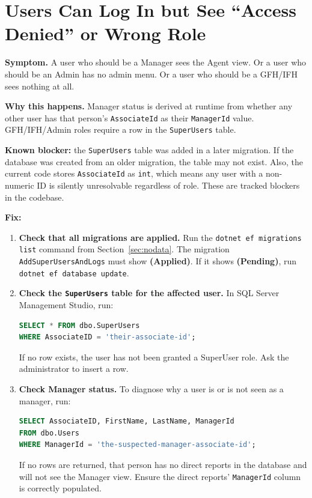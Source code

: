 \documentclass[a4paper,11pt]{article}
\begin{document}
\section{Users Can Log In but See ``Access Denied'' or Wrong Role}
\label{sec:wrongrole}

\textbf{Symptom.}
A user who should be a Manager sees the Agent view.
Or a user who should be an Admin has no admin menu.
Or a user who should be a GFH/IFH sees nothing at all.

\textbf{Why this happens.}
Manager status is derived at runtime from whether any other user has that person's
\texttt{AssociateId} as their \texttt{ManagerId} value.
GFH/IFH/Admin roles require a row in the \texttt{SuperUsers} table.

\begin{warnbox}
\textbf{Known blocker:} the \texttt{SuperUsers} table was added in a later migration.
If the database was created from an older migration, the table may not exist.
Also, the current code stores \texttt{AssociateId} as \texttt{int},
which means any user with a non-numeric ID is silently unresolvable regardless of role.
These are tracked blockers in the codebase.
\end{warnbox}

\textbf{Fix:}

\begin{enumerate}
  \item \textbf{Check that all migrations are applied.}
        Run the \texttt{dotnet ef migrations list} command from Section~\ref{sec:nodata}.
        The migration \texttt{AddSuperUsersAndLogs} must show \textbf{(Applied)}.
        If it shows \textbf{(Pending)}, run \texttt{dotnet ef database update}.
  \item \textbf{Check the \texttt{SuperUsers} table for the affected user.}
        In SQL Server Management Studio, run:
\begin{lstlisting}[language=SQL]
SELECT * FROM dbo.SuperUsers
WHERE AssociateID = 'their-associate-id';
\end{lstlisting}
        If no row exists, the user has not been granted a SuperUser role.
        Ask the administrator to insert a row.
  \item \textbf{Check Manager status.}
        To diagnose why a user is or is not seen as a manager, run:
\begin{lstlisting}[language=SQL]
SELECT AssociateID, FirstName, LastName, ManagerId
FROM dbo.Users
WHERE ManagerId = 'the-suspected-manager-associate-id';
\end{lstlisting}
        If no rows are returned, that person has no direct reports in the database
        and will not see the Manager view.
        Ensure the direct reports' \texttt{ManagerId} column is correctly populated.
\end{enumerate}
\end{document}
